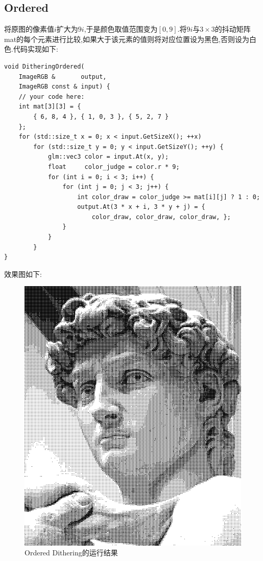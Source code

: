 \documentclass{ctexart}
\begin{document}
\subsection*{Ordered}
将原图的像素值$i$扩大为$9i$,于是颜色取值范围变为$[0,9]$.将$9i$与$3\times3$的抖动矩阵{\codefont mat}的每个元素进行比较,如果大于该元素的值则将对应位置设为黑色,否则设为白色.代码实现如下:
\begin{lstlisting}
void DitheringOrdered(
    ImageRGB &       output,
    ImageRGB const & input) {
    // your code here:
    int mat[3][3] = {
        { 6, 8, 4 }, { 1, 0, 3 }, { 5, 2, 7 }
    };
    for (std::size_t x = 0; x < input.GetSizeX(); ++x)
        for (std::size_t y = 0; y < input.GetSizeY(); ++y) {
            glm::vec3 color = input.At(x, y);
            float     color_judge = color.r * 9;
            for (int i = 0; i < 3; i++) {
                for (int j = 0; j < 3; j++) {
                    int color_draw = color_judge >= mat[i][j] ? 1 : 0;
                    output.At(3 * x + i, 3 * y + j) = {
                        color_draw, color_draw, color_draw, };
                }
            }
        }
}
\end{lstlisting}
效果图如下:
\begin{figure}[H]
    \centering\includegraphics[scale=0.5]{figure/Ordered.png}
    \caption{Ordered Dithering的运行结果}
\end{figure}
\end{document}
